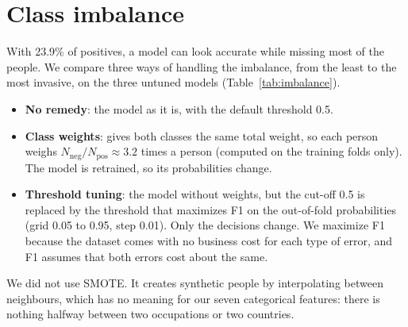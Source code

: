 \section{Class imbalance}
\label{sec:imbalance}

With 23.9\% of positives, a model can look accurate while missing most of the
\pos{} people. We compare three ways of handling the imbalance, from the least
to the most invasive, on the three untuned models (Table~\ref{tab:imbalance}).
\begin{itemize}
  \item \textbf{No remedy}: the model as it is, with the default threshold 0.5.
  \item \textbf{Class weights}:  gives both
  classes the same total weight, so each \pos{} person weighs
  $N_{\text{neg}}/N_{\text{pos}} \approx 3.2$ times a \negc{} person (computed
  on the training folds only). The model is retrained, so its probabilities
  change.
  \item \textbf{Threshold tuning}: the model without weights, but the cut-off
  0.5 is replaced by the threshold that maximizes F1 on the out-of-fold
  probabilities (grid 0.05 to 0.95, step 0.01). Only the decisions change. We
  maximize F1 because the dataset comes with no business cost for each type of
  error, and F1 assumes that both errors cost about the same.
\end{itemize}
We did not use SMOTE. It creates synthetic people by interpolating between
neighbours, which has no meaning for our seven categorical features: there is
nothing halfway between two occupations or two countries.

